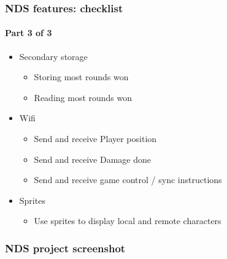 \documentclass{beamer}
\begin{document}
\begin{frame}
    \frametitle{NDS features: checklist}
    \framesubtitle{Part 3 of 3}

    \begin{itemize}
        \item Secondary storage
              \begin{itemize}
                  \item Storing most rounds won
                  \item Reading most rounds won
              \end{itemize}
        \item Wifi
              \begin{itemize}
                  \item Send and receive Player position
                  \item Send and receive Damage done
                  \item Send and receive game control / sync instructions
              \end{itemize}
        \item Sprites
              \begin{itemize}
                  \item Use sprites to display local and remote characters
              \end{itemize}

    \end{itemize}

\end{frame}


\begin{frame}
    \frametitle{NDS project screenshot}

\end{frame}
\end{document}

